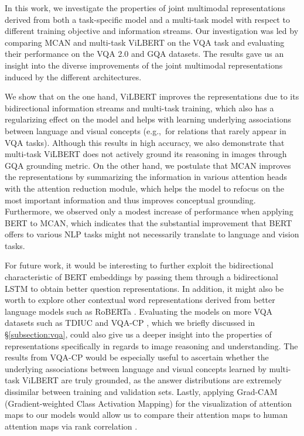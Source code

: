\documentclass{article}
\begin{document}
In this work, we investigate the properties of joint multimodal representations derived from both a task-specific model and a multi-task model with respect to different training objective and information streams. Our investigation was led by comparing MCAN and multi-task ViLBERT on the VQA task and evaluating their performance on the VQA 2.0 and GQA datasets. The results gave us an insight into the diverse improvements of the joint multimodal representations induced by the different architectures. 

We show that on the one hand, ViLBERT improves the representations due to its bidirectional information streams and multi-task training, which also has a regularizing effect on the model and helps with learning underlying associations between language and visual concepts (e.g.,\ for relations that rarely appear in VQA tasks). Although this results in high accuracy, we also demonstrate that multi-task ViLBERT does not actively ground its reasoning in images through GQA grounding metric. %
On the other hand, we postulate that MCAN improves the representations by summarizing the information in various attention heads with the attention reduction module, which helps the model to refocus on the most important information and thus improves conceptual grounding. %
Furthermore, we observed only a modest increase of performance when applying BERT to MCAN, which indicates that the substantial improvement that BERT offers to various NLP tasks might not necessarily translate to language and vision tasks. %

For future work, it would be interesting to further exploit the bidirectional characteristic of BERT embeddings by passing them through a bidirectional LSTM to obtain better question representations. In addition, it might also be worth to explore other contextual word representations derived from better language models such as RoBERTa \citep{liu2019roberta}. %
Evaluating the models on more VQA datasets such as TDIUC \citep{kafle2017tdiuc} and VQA-CP \citep{agrawal12018gvqa}, which we briefly discussed in \S \ref{subsection:vqa}, could also give us a deeper insight into the properties of representations specifically in regards to image reasoning and understanding. The results from VQA-CP would be especially useful to ascertain whether the underlying associations between language and visual concepts learned by multi-task ViLBERT are truly grounded, as the answer distributions are extremely dissimilar between training and validation sets. Lastly, applying Grad-CAM (Gradient-weighted Class Activation Mapping) \citep{selvaraju2017gradcam} for the visualization of attention maps to our models would allow us to compare their attention maps to human attention maps via rank correlation \citep{das2016human}.
\end{document}
